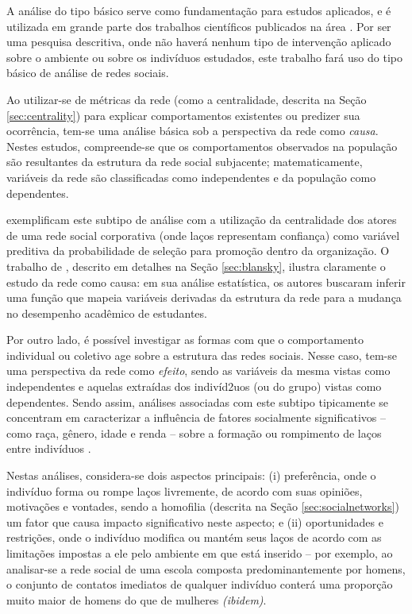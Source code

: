 A análise do tipo básico serve como fundamentação para estudos aplicados, e é utilizada em grande parte dos trabalhos científicos publicados na área \cite{Borgatti2013}. Por ser uma pesquisa descritiva, onde não haverá nenhum tipo de intervenção aplicado sobre o ambiente ou sobre os indivíduos estudados, este trabalho fará uso do tipo básico de análise de redes sociais.

Ao utilizar-se de métricas da rede (como a centralidade, descrita na Seção \ref{sec:centrality}) para explicar comportamentos existentes ou predizer sua ocorrência, tem-se uma análise básica sob a perspectiva da rede como \emph{causa}. Nestes estudos, compreende-se que os comportamentos observados na população são resultantes da estrutura da rede social subjacente; matematicamente, variáveis da rede são classificadas como independentes e da população como dependentes.

 exemplificam este subtipo de análise com a utilização da centralidade dos atores de uma rede social corporativa (onde laços representam confiança) como variável preditiva da probabilidade de seleção para promoção dentro da organização. O trabalho de , descrito em detalhes na Seção \ref{sec:blansky}, ilustra claramente o estudo da rede como causa: em sua análise estatística, os autores buscaram inferir uma função que mapeia variáveis derivadas da estrutura da rede para a mudança no desempenho acadêmico de estudantes.

Por outro lado, é possível investigar as formas com que o comportamento individual ou coletivo age sobre a estrutura das redes sociais. Nesse caso, tem-se uma perspectiva da rede como \emph{efeito}, sendo as variáveis da mesma vistas como independentes e aquelas extraídas dos indivíd2uos (ou do grupo) vistas como dependentes. Sendo assim, análises associadas com este subtipo tipicamente se concentram em caracterizar a influência de fatores socialmente significativos -- como raça, gênero, idade e renda -- sobre a formação ou rompimento de laços entre indivíduos \cite{Borgatti2013}.

Nestas análises, considera-se dois aspectos principais: (i) preferência, onde o indivíduo forma ou rompe laços livremente, de acordo com suas opiniões, motivações e vontades, sendo a homofilia (descrita na Seção \ref{sec:socialnetworks}) um fator que causa impacto significativo neste aspecto; e (ii) oportunidades e restrições, onde o indivíduo modifica ou mantém seus laços de acordo com as limitações impostas a ele pelo ambiente em que está inserido -- por exemplo, ao analisar-se a rede social de uma escola composta predominantemente por homens, o conjunto de contatos imediatos de qualquer indivíduo conterá uma proporção muito maior de homens do que de mulheres \textit{(ibidem)}.

